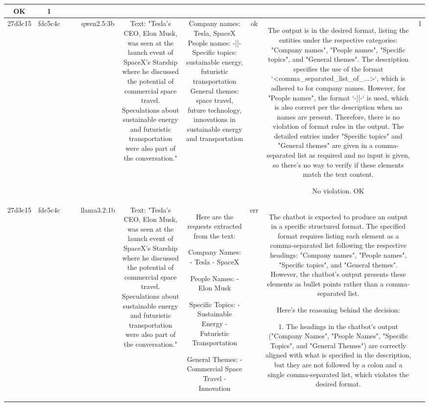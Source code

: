 \begin{table}[h!]
\begin{tabular}{|c|c|c|c|c|c|c|c|c|c|}
OK & 1\\
\hline
27d3c15 & fdc5c4c &  &  & qwen2.5:3b & Text: "Tesla's CEO, Elon Musk, was seen at the launch event of SpaceX's Starship where he discussed the potential of commercial space travel. Speculations about sustainable energy and futuristic transportation were also part of the conversation." & Company names: Tesla, SpaceX
People names: -||-
Specific topics: sustainable energy, futuristic transportation
General themes: space travel, future technology, innovations in sustainable energy and transportation & ok & The output is in the desired format, listing the entities under the respective categories: "Company names", "People names", "Specific topics", and "General themes". The description specifies the use of the format `<comma_separated_list_of_...>`, which is adhered to for company names. However, for "People names", the format `-||-` is used, which is also correct per the description when no names are present. Therefore, there is no violation of format rules in the output. The detailed entries under "Specific topics" and "General themes" are given in a comma-separated list as required and no input is given, so there's no way to verify if these elements match the text content.

No violation.
OK & 1\\
\hline
27d3c15 & fdc5c4c &  &  & llama3.2:1b & Text: "Tesla's CEO, Elon Musk, was seen at the launch event of SpaceX's Starship where he discussed the potential of commercial space travel. Speculations about sustainable energy and futuristic transportation were also part of the conversation." & Here are the requests extracted from the text:

Company Names:
- Tesla
- SpaceX

People Names:
- Elon Musk

Specific Topics:
- Sustainable Energy
- Futuristic Transportation

General Themes:
- Commercial Space Travel
- Innovation & err & The chatbot is expected to produce an output in a specific structured format. The specified format requires listing each element as a comma-separated list following the respective headings: "Company names", "People names", "Specific topics", and "General themes". However, the chatbot's output presents these elements as bullet points rather than a comma-separated list.

Here's the reasoning behind the decision:

1. The headings in the chatbot's output ("Company Names", "People Names", "Specific Topics", and "General Themes") are correctly aligned with what is specified in the description, but they are not followed by a colon and a single comma-separated list, which violates the desired format.
 

\end{tabular}
\end{table}
